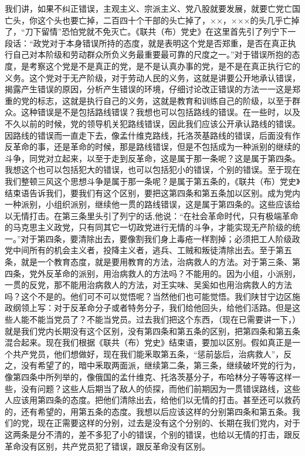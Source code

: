 我们讲，如果不纠正错误，主观主义、宗派主义、党八股就要发展，就要亡党亡国亡头，你这个头也要亡掉，二百四十个干部的头亡掉了，××，×××的头几乎亡掉了，“刀下留情”恐怕党就不免灭亡。《联共（布）党史》在这里首先引了列宁下一段话：“政党对于本身错误所持的态度，就是表明这个党是否郑重，是否在真正执行自己对本阶级和劳动群众所负义务最重要最可靠的尺度之一。”对于错误所抱的态度，是考察这个党是不是真正的党，是不是认真办事的党，是不是在真正执行它的义务。这个党对于无产阶级，对于劳动人民的义务，这就是讲要公开地承认错误，揭露产生错误的原因，分析产生错误的环境，仔细讨论改正错误的方法一一这是郑重的党的标志，这就是执行自己的义务，这就是教育和训练自己的阶级，以至于群众。这种错误是不是包括路线错误？我想也可以包括路线的错误。在一些时，以及不久以前的时候，党的领导机关犯路线错误，因此我们应该公开承认路线的错误。因路线的错误而一直走下去，像孟什维克路线，托洛茨基路线的错误，后面没有作反革命的事，还是革命的时候，那是路线错误，但是不包括成为一种派别的继续的斗争，同党对立起来，以至于走到反革命，这是属于那一条呢？这是属于第四条。我想这个也可以包括犯大的错误，也可以包括犯小的错误，个别的错误。至于现在我们整顿三风这个思想斗争是属于那一条呢？是属于第五条的，《联共（布）党史》结束语告诉我们，要我们有这个区别，要把这第四条和第五条加以区别。成为党内一种派别，小组织派别，继续他一贯的路线错误，这是属于第四条的。这些应该给以无情打击。在第三条里头引了列宁的话,他说：“在社会革命时代，只有极端革命的马克思主义政党，只有同其它一切政党进行无情的斗争，才能实现无产阶级的统一。”对于第四条，要清除出去，要像割我们身上毒疮一样割掉；必须把工人阶级政党中间所有的机会主义者，投降主义者，逃兵、工贼和叛徒清除出去。至于第五条，就是一个教育态度，就是要用教育的方法，治病救人的方法。对于第三条、第四条，党外反革命的派别，用治病救人的方法吗？不能用的。因为小组，小派别，一贯的反党，那不能用治病救人的方法，对王实味、吴奚如也用治病救人的方法吗？这个不是的。他们可不可以觉悟呢？当然他们也可能觉悟。我们陕甘宁边区施政纲领上写：对于反革命分子或者特务分子，我们给他回头，给他们活路。但是这些人能不能当党员了？不能当党员。过去我们把这个东西，（现在已需要讲一下，）就是我们党内长期没有这个区别，没有第四条和第五条的区别，把第四条和第五条混合起来。现在我们根据《联共（布）党史》结束语，要加以区别。假如真正是一个共产党员，他们想做好，现在我们能釆取第五条，“惩前毖后，治病救人”，反之，没有希望了的，暗中釆取两面派，继续第二条，第三条，继续破坏党的行为，像第四条中所列举的，像俄国的孟什维克、托洛茨基分子，布哈林分子等等这样一些，没有问题？这些人后期当了敌人的侦探，而他们前期因为一贯错误路线，这些人应该用第四条的态度。把他们清除出去，给他们以无情的打击。甚至还可以救药的，还有希望的，用第五条的态度。我想以后应该这样的分别第四条和第五条。我们的党，现在正需要这样的分别，过去是没有这个分别的、长期在我们党内，对于这两条是分不清的，差不多犯了小的错误，个别的错误，也给以无情的打击，跟反革命没有区别，共产党员犯了错误，跟反革命没有区别。

